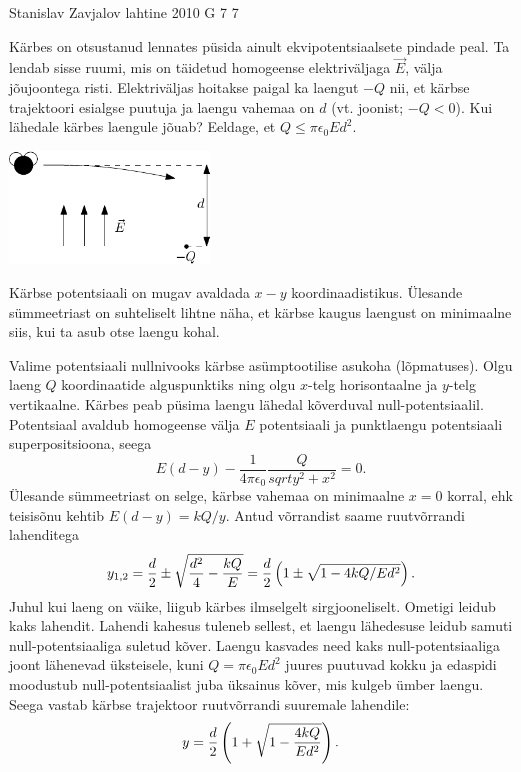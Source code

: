 {Stanislav Zavjalov} %
{lahtine} %
{2010} %
{G 7} %
{7} %
{
\ifStatement
Kärbes on otsustanud
lennates püsida ainult ekvipotentsiaalsete pindade peal. Ta lendab sisse ruumi,
mis on täidetud homogeense elektriväljaga $\vec{E}$, välja jõujoontega risti.
Elektriväljas hoitakse paigal ka laengut $-Q$ nii, et kärbse
trajektoori esialgse puutuja ja laengu vahemaa on $d$ (vt. joonist; $-Q < 0$).
Kui lähedale kärbes laengule jõuab? Eeldage, et $Q \le \pi\epsilon_0Ed^2$.
\begin{center}
	\includegraphics[width=0.4\textwidth]{2010-lahg-07-muha_tekst}
\end{center}
\fi


\ifHint
Kärbse potentsiaali on mugav avaldada $x-y$ koordinaadistikus. Ülesande sümmeetriast on suhteliselt lihtne näha, et kärbse kaugus laengust on minimaalne siis, kui ta asub otse laengu kohal.
\fi


\ifSolution
Valime potentsiaali nullnivooks kärbse asümptootilise asukoha (lõpmatuses). 
Olgu laeng $Q$ koordinaatide alguspunktiks ning olgu $x$-telg horisontaalne ja $y$-telg vertikaalne. 
Kärbes peab püsima laengu lähedal kõverduval null-potentsiaalil. 
Potentsiaal avaldub homogeense välja $E$ potentsiaali ja punktlaengu potentsiaali superpositsioona, seega 
\[
E(d - y) - \frac{1}{4\pi\epsilon_0}\frac{Q}{sqrt{y^2 + x^2}} = 0.
\]
Ülesande sümmeetriast on selge, kärbse vahemaa on minimaalne $x=0$ korral, ehk teisisõnu kehtib $E(d-y) = kQ/y$. Antud võrrandist saame ruutvõrrandi lahenditega
\[
y_{1,2} = {d \over 2} \pm \sqrt{\frac {d^2}4 - {kQ \over E}} = {d \over 2}\left( 1 \pm \sqrt{1 - 4kQ / Ed^2}\right).
\] 
Juhul kui laeng on väike, liigub kärbes ilmselgelt sirgjooneliselt. Ometigi leidub kaks lahendit. Lahendi kahesus tuleneb sellest, et laengu lähedesuse leidub samuti
null-potentsiaaliga suletud kõver. Laengu kasvades need kaks null-potentsiaaliga joont lähenevad üksteisele, kuni $Q=\pi\epsilon_0Ed^2$ juures 
puutuvad kokku ja edaspidi moodustub null-potentsiaalist juba üksainus kõver, mis kulgeb ümber laengu. 
Seega vastab kärbse trajektoor ruutvõrrandi suuremale lahendile:
$$y= {d \over 2}\left(1 + \sqrt{1 - {4kQ \over Ed^2}}\right).$$ 
\fi
}